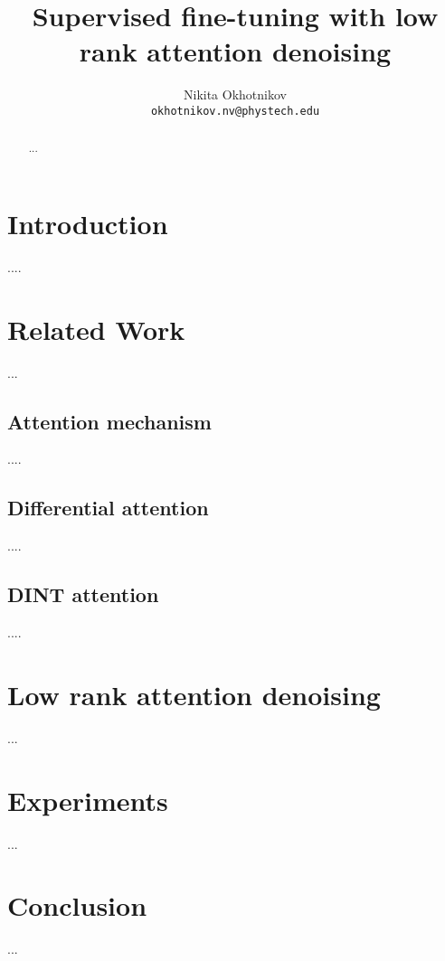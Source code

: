 \documentclass{article}
\title{Supervised fine-tuning with low rank attention denoising}
\author{Nikita Okhotnikov\\
	\texttt{okhotnikov.nv@phystech.edu} \\
}
\date{}
\begin{document}
\maketitle
\begin{abstract}
    ...
\end{abstract}

\section{Introduction}
    ....

\section{Related Work}
    ...
\subsection{Attention mechanism}
    ....
\subsection{Differential attention}
    ....
\subsection{DINT attention}
    ....
    

\section{Low rank attention denoising}

    ...

\section{Experiments}
    ... 
\section{Conclusion}

    ...





\end{document}
